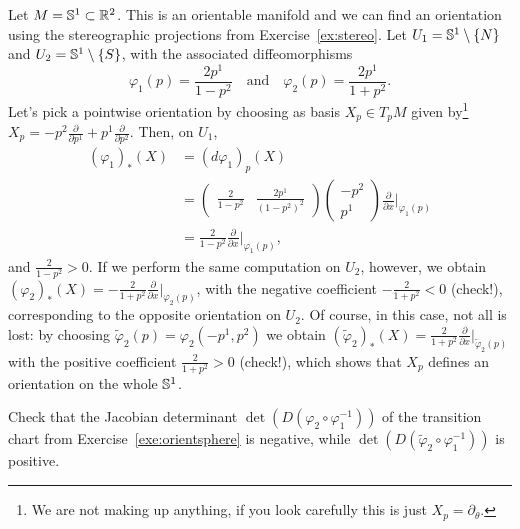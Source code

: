 \begin{example}\label{exe:orientsphere}
  Let $M = \mathbb{S}^1\subset \mathbb{R}^2$.
  This is an orientable manifold and we can find an orientation using the stereographic projections from Exercise~\ref{ex:stereo}.
  Let $U_1 = \mathbb{S}^1\setminus\{N\}$ and $U_2 = \mathbb{S}^1\setminus\{S\}$, with the associated diffeomorphisms
  \begin{equation}
    \varphi_1(p) = \frac{2p^1}{1-p^2}
    \quad\mbox{and}\quad
    \varphi_2(p) = \frac{2p^1}{1+p^2}.
  \end{equation}
  Let's pick a pointwise orientation by choosing as basis $X_p\in T_pM$ given by\footnote{We are not making up anything, if you look carefully this is just $X_p = \partial_\theta$.} $X_p = -p^2 \frac{\partial}{\partial p^1} + p^1 \frac{\partial}{\partial p^2}$.
  Then, on $U_1$,
  \begin{align}
    (\varphi_1)_*(X) &= (d\varphi_1)_p(X) \\
    &= \left(\begin{smallmatrix}
      \frac{2}{1-p^2} & \frac{2p^1}{(1-p^2)^2}
    \end{smallmatrix}\right)
    \left(\begin{smallmatrix}
      -p^2 \\ p^1
    \end{smallmatrix}\right) \frac{\partial}{\partial x}\Big|_{\varphi_1(p)}\\
    &= \frac{2}{1-p^2} \frac{\partial}{\partial x}\Big|_{\varphi_1(p)},
  \end{align}
  and $\frac{2}{1-p^2}>0$.
  If we perform the same computation on $U_2$, however, we obtain $(\varphi_2)_*(X) = -\frac{2}{1+p^2}\frac{\partial}{\partial x}\Big|_{\varphi_2(p)}$, with the negative coefficient $-\frac{2}{1+p^2} < 0$ (check!), corresponding to the opposite orientation on $U_2$.
  Of course, in this case, not all is lost: by choosing $\widetilde\varphi_2(p) = \varphi_2(-p^1, p^2)$ we obtain $(\widetilde\varphi_2)_*(X) = \frac{2}{1+p^2} \frac{\partial}{\partial x}\Big|_{\widetilde\varphi_2(p)}$ with the positive coefficient $\frac{2}{1+p^2} > 0$ (check!), which shows that $X_p$ defines an orientation on the whole $\mathbb{S}^1$.
\end{example}

\begin{exercise}
  Check that the Jacobian determinant $\det(D(\varphi_2\circ \varphi_1^{-1}))$ of the transition chart from Exercise~\ref{exe:orientsphere} is negative, while $\det(D(\widetilde\varphi_2\circ \varphi_1^{-1}))$ is positive.
\end{exercise}

